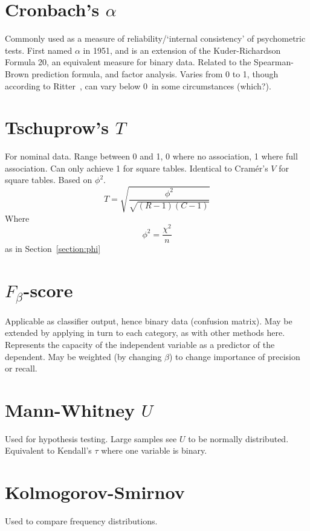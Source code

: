 \documentclass[11pt]{article}
\begin{document}
\section{Cronbach's $\alpha$}
Commonly used as a measure of reliability/`internal consistency' of psychometric tests.  First named $\alpha$ in 1951, and is an extension of the Kuder-Richardson Formula 20, an equivalent measure for binary data.  Related to the Spearman-Brown prediction formula, and factor analysis.  Varies from 0 to 1, though according to Ritter~\cite{ritter2010understanding}, can vary below 0~in some circumstances {\color{red} (which?)}.




\section{Tschuprow's $T$}
For nominal data.  Range between 0 and 1, 0 where no association, 1 where full association.  Can only achieve 1 for square tables. Identical to Cram\'er's $V$ for square tables.  Based on $\phi^2$.
$$
T = \sqrt{ \frac{ \phi^2 }{ \sqrt{ (R-1)(C-1) } } }
$$
Where 
$$
\phi^2 = \frac{\chi^2}{n}
$$
as in Section~\ref{section:phi}




\section{$F_\beta$-score}
Applicable as classifier output, hence binary data (confusion matrix).  May be extended by applying in turn to each category, as with other methods here.  Represents the capacity of the independent variable as a predictor of the dependent.  May be weighted (by changing $\beta$) to change importance of precision or recall.




\section{Mann-Whitney $U$}
Used for hypothesis testing.  Large samples see $U$ to be normally distributed.  Equivalent to Kendall's $\tau$ where one variable is binary.  




\section{Kolmogorov-Smirnov}
Used to compare frequency distributions.
\end{document}

